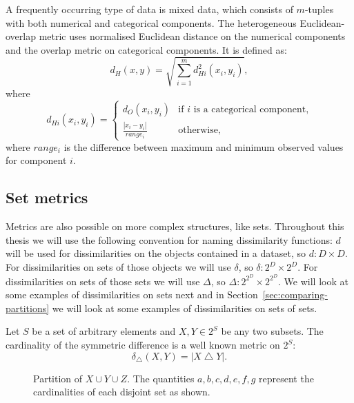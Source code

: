\documentclass[a4paper]{report}
\DeclareMathOperator{\symdif}{\bigtriangleup}
\newcommand{\dset}{D}
\newcommand{\psettimes}{\! \times}
\newcommand{\pspsettimes}{\! \! \times}
\begin{document}
A frequently occurring type of data is mixed data, which consists of
$m$-tuples with both numerical and categorical components.  The heterogeneous
Euclidean-overlap metric uses normalised Euclidean distance on the numerical
components and the overlap metric on categorical components.  It is defined
as:
\begin{equation*}
  d_{H}(x,y) = \sqrt{\sum_{i=1}^{m} d_{Hi}^2(x_i,y_i)},
\end{equation*}
where
\begin{equation*}
  d_{Hi}(x_i,y_i) =
  \begin{cases}
    d_O(x_i,y_i) & \text{if $i$ is a categorical component,} \\
    \displaystyle \frac{|x_i-y_i|}{range_i} & \text{otherwise,}
  \end{cases}
\end{equation*}
where $range_i$ is the difference between maximum and minimum observed values
for component $i$.

\subsection{Set metrics}
\label{sec:set-metric}

Metrics are also possible on more complex structures, like sets.  Throughout
this thesis we will use the following convention for naming dissimilarity
functions: $d$ will be used for dissimilarities on the objects contained in a
dataset, so $d \colon \dset \times \dset$.  For dissimilarities on sets of
those objects we will use $\delta$, so $\delta \colon 2^{\dset} \psettimes
2^{\dset}$.  For dissimilarities on sets of those sets we will use $\Delta$,
so $\Delta \colon 2^{2^{\dset}} \pspsettimes 2^{2^{\dset}}$.  We will look at
some examples of dissimilarities on sets next and in
Section~\ref{sec:comparing-partitions} we will look at some examples of
dissimilarities on sets of sets.

Let $S$ be a set of arbitrary elements and $X,Y \in 2^{S}$ be any two subsets.
The cardinality of the symmetric difference is a well known metric on $2^{S}$:
\begin{equation*}
  \delta_{\symdif}(X,Y) = |X \symdif Y|.
\end{equation*}

\begin{figure}
  \centering
  \caption{Partition of $X \cup Y \cup Z$.  The quantities $a,b,c,d,e,f,g$
    represent the cardinalities of each disjoint set as shown.}
  \label{fig:partition}
\end{figure}
\end{document}
